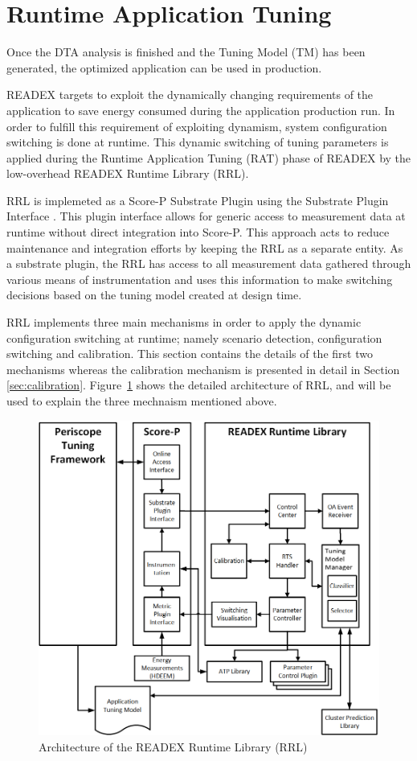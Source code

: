 \section{Runtime Application Tuning} \label{rat}

Once the DTA analysis is finished and the Tuning Model (TM) has been generated, the optimized application can be used in production. 

READEX targets to exploit the dynamically changing requirements of the application to save energy consumed during the application production run. In order to fulfill this requirement of exploiting dynamism, system configuration switching is done at runtime. This dynamic switching of tuning parameters is applied during the Runtime Application Tuning (RAT) phase of READEX by the low-overhead READEX Runtime Library (RRL). 

RRL is implemeted as a Score-P Substrate Plugin using the Substrate Plugin Interface \cite{Schoene2017}. This plugin interface allows for generic access to measurement data at runtime without direct integration into Score-P. This approach acts to reduce maintenance and integration efforts by keeping the RRL as a separate entity. As a substrate plugin, the RRL has
access to all measurement data gathered through various means of instrumentation and uses this information to make switching decisions based on the tuning model created at design time.

RRL implements three main mechanisms in order to apply the dynamic configuration switching at runtime; namely scenario detection, configuration switching and calibration. This section contains the details of the first two mechanisms whereas the calibration mechanism is presented in detail in Section \ref{sec:calibration}.
Figure~\ref{fig:rrl} shows the detailed architecture of RRL, and will be used to explain the three mechnaism mentioned above.

\begin{figure}[!t]
\centering
\includegraphics[width=.95\columnwidth]{figures/RRL_Architecture.png}
\caption{Architecture of the READEX Runtime Library (RRL)}
\label{fig:rrl}
\end{figure}


